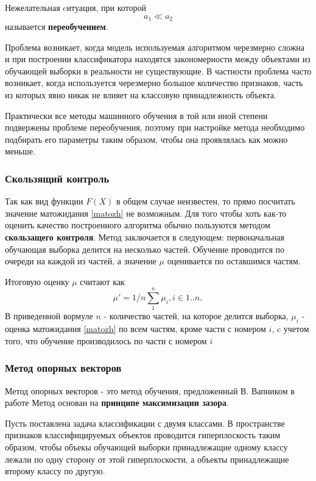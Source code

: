 Нежелательная cитуация, при которой 
\begin{equation}
	a_1 \ll a_2
\end{equation} называется \textbf{переобучением}. 

Проблема возникает, когда модель используемая алгоритмом черезмерно сложна и при построении классификатора находятся закономерности между объектами из обучающей выборки в реальности не существующие. В частности проблема часто возникает, когда используется черезмерно большое количество признаков, часть из которых явно никак не влияет на классовую принадлежность объекта.

Практически все методы машинного обучения в той или иной степени подвержены проблеме переобучения, поэтому при настройке метода необходимо подбирать его параметры таким образом, чтобы она проявлялась как можно меньше.
\subsubsection{Скользящий контроль}
Так как вид функции $F(X)$ в общем случае  неизвестен, то прямо посчитать значение матожидания \ref{matozh} не возможным. Для того чтобы хоть как-то оценить качество построенного алгоритма обычно пользуются методом \textbf{скользащего контроля}. Метод заключается в следующем: первоначальная обучающая выборка делится на несколько частей. Обучение проводится по очереди на каждой из частей, а значение $\mu$ оценивается по оставшимся частям.

Итоговую оценку $\mu$ считают как
\begin{equation}
\mu' = 1/n\sum_1^n{\mu_i}, i \in 1..n, 
\end{equation}
В приведенной вормуле $n$ - количество частей, на которое делится выборка, $\mu_i$ - оценка матожидания \ref{matozh} по всем частям, кроме части с номером $i$, c учетом того, что обучение производилось по части с номером $i$


\subsubsection{Метод опорных векторов}
Метод опорных векторов - это метод обучения, предложенный В. Вапником в работе \cite{SVN}
Метод основан на \textbf{принципе максимизации зазора}. 

Пусть поставлена задача классификации с двумя классами. В пространстве признаков классифицируемых объектов проводится гиперплоскость таким образом, чтобы объекы обучающей выборки принадлежащие одному классу лежали по одну сторону от этой гиперплоскости, а объекты принадлежащие второму классу по другую.

